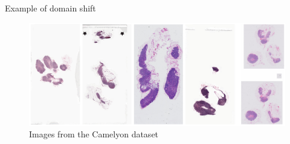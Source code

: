 \documentclass[xcolor=pdftex,dvipsnames,table,mathserif]{beamer}
\begin{document}
\begin{frame}{Example of domain shift}


  \begin{figure}[ht]
  \centering
  \includegraphics[width=\textwidth]{camelyon_samples}\\
  Images from the Camelyon dataset~\cite{litjens_1399_2018}
\end{figure}


\end{frame}








\end{document}

